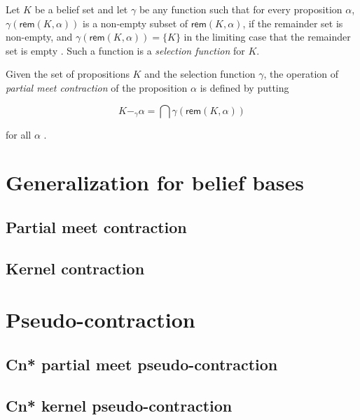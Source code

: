 \begin{definition}
    Let $K$ be a belief set and let $\gamma$ be any function such that for every proposition $\alpha$, $\gamma(\textsf{rem}(K, \alpha))$ is a non-empty subset of $\textsf{rem}(K, \alpha)$, if the remainder set is non-empty, and $\gamma(\textsf{rem}(K, \alpha)) = \{ K \}$ in the limiting case that the remainder set is empty \citep{AGM1985}. Such a function is a \textit{selection function} for $K$.
\end{definition}

\begin{definition}
    Given the set of propositions $K$ and the selection function $\gamma$, the operation of \textit{partial meet contraction} of the proposition $\alpha$ is defined by putting

    $$K -_{\gamma} \alpha = \bigcap \gamma(\textsf{rem}(K, \alpha))$$

    for all $\alpha$ \citep{AGM1985}.
\end{definition}

\section{Generalization for belief bases}


\subsection{Partial meet contraction}
\subsection{Kernel contraction}

\section{Pseudo-contraction}
\subsection{Cn* partial meet pseudo-contraction}
\subsection{Cn* kernel pseudo-contraction}
